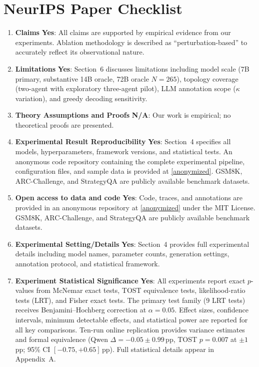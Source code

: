 \documentclass{article}
\renewcommand{\answerYes}[1]{\textbf{Yes}: #1}
\renewcommand{\answerNA}[1]{\textbf{N/A}: #1}
\newcommand{\qwenSevenTwoBN}{265}
\begin{document}
\section*{NeurIPS Paper Checklist}

\begin{enumerate}

\item {\bf Claims}
    \answerYes{All claims are supported by empirical evidence from our experiments. Ablation methodology is described as ``perturbation-based'' to accurately reflect its observational nature.}

\item {\bf Limitations}
    \answerYes{Section~6 discusses limitations including
model scale (7B primary, substantive 14B oracle, 72B oracle $N{=}\qwenSevenTwoBN{}$), topology coverage (two-agent with exploratory three-agent pilot), LLM annotation scope ($\kappa$ variation), and greedy decoding sensitivity.}

\item {\bf Theory Assumptions and Proofs}
    \answerNA{Our work is empirical; no theoretical proofs are presented.}

\item {\bf Experimental Result Reproducibility}
    \answerYes{Section~4 specifies all models, hyperparameters, framework versions, and statistical tests. An anonymous code repository containing the complete experimental pipeline, configuration files, and sample data is provided at \url{[anonymized]}. GSM8K, ARC-Challenge, and StrategyQA are publicly available benchmark datasets.}

\item {\bf Open access to data and code}
    \answerYes{Code, traces, and annotations are provided in an anonymous repository at \url{[anonymized]} under the MIT License. GSM8K, ARC-Challenge, and StrategyQA are publicly available benchmark datasets.}

\item {\bf Experimental Setting/Details}
    \answerYes{Section~4 provides full experimental details including model names, parameter counts, generation settings, annotation protocol, and statistical framework.}

\item {\bf Experiment Statistical Significance}
    \answerYes{All experiments report exact $p$-values from McNemar exact tests, TOST equivalence tests, likelihood-ratio tests (LRT), and Fisher exact tests. The primary test family (9 LRT tests) receives Benjamini--Hochberg correction at $\alpha = 0.05$. Effect sizes, confidence intervals, minimum detectable effects, and statistical power are reported for all key comparisons. Ten-run online replication provides variance estimates and formal equivalence (Qwen $\Delta = -0.05 \pm 0.99$\,pp, TOST $p = 0.007$ at $\pm 1$\,pp; 95\% CI $[-0.75, +0.65]$\,pp). Full statistical details appear in Appendix~A.}


\end{enumerate}
\end{document}
